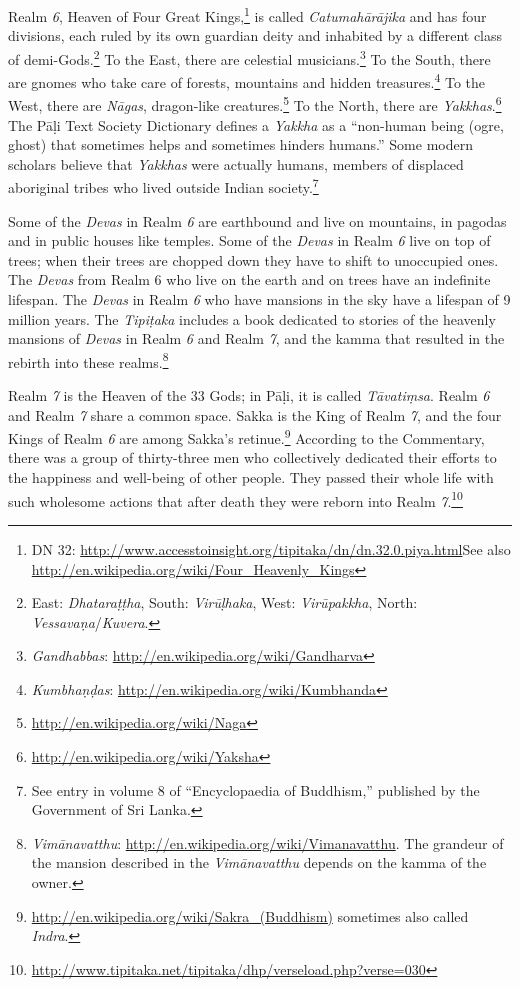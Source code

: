 \pagebreak

Realm \textit{6}, Heaven of Four Great Kings,\footnote{DN 32: \url{http://www.accesstoinsight.org/tipitaka/dn/dn.32.0.piya.html}\newline See also \url{http://en.wikipedia.org/wiki/Four_Heavenly_Kings}} is called \textit{Catumahārājika} and has four divisions, each ruled by its own guardian deity and inhabited by a different class of demi-Gods.\footnote{East: \textit{Dhataraṭṭha}, South: \textit{Virūḷhaka}, West: \textit{Virūpakkha}, North: \textit{Vessavaṇa}/\textit{Kuvera}.} To the East, there are celestial musicians.\footnote{\textit{Gandhabbas}: \url{http://en.wikipedia.org/wiki/Gandharva}} To the South, there are gnomes who take care of forests, mountains and hidden treasures.\footnote{\textit{Kumbhaṇḍas}: \url{http://en.wikipedia.org/wiki/Kumbhanda}} To the West, there are \textit{Nāgas}, dragon-like creatures.\footnote{\url{http://en.wikipedia.org/wiki/Naga}} To the North, there are \textit{Yakkhas}.\footnote{\url{http://en.wikipedia.org/wiki/Yaksha}} The Pāḷi Text Society Dictionary defines a \textit{Yakkha} as a “non-human being (ogre, ghost) that sometimes helps and sometimes hinders humans.” Some modern scholars believe that \textit{Yakkhas} were actually humans, members of displaced aboriginal tribes who lived outside Indian society.\footnote{See entry in volume 8 of “Encyclopaedia of Buddhism,” published by the Government of Sri Lanka.}

Some of the \textit{Devas} in Realm \textit{6} are earthbound and live on mountains, in pagodas and in public houses like temples. Some of the \textit{Devas} in Realm \textit{6} live on top of trees; when their trees are chopped down they have to shift to unoccupied ones. The \textit{Devas} from Realm 6 who live on the earth and on trees have an indefinite lifespan. The \textit{Devas} in Realm \textit{6} who have mansions in the sky have a lifespan of 9 million years. The \textit{Tipiṭaka} includes a book dedicated to stories of the heavenly mansions of \textit{Devas} in Realm \textit{6} and Realm \textit{7}, and the kamma that resulted in the rebirth into these realms.\footnote{\textit{Vimānavatthu}: \url{http://en.wikipedia.org/wiki/Vimanavatthu}. The grandeur of the mansion described in the \textit{Vimānavatthu} depends on the kamma of the owner.}

Realm \textit{7} is the Heaven of the 33 Gods; in Pāḷi, it is called \textit{Tāvatiṃsa}. Realm \textit{6} and Realm \textit{7} share a common space. Sakka is the King of Realm \textit{7}, and the four Kings of Realm \textit{6} are among Sakka’s retinue.\footnote{\url{http://en.wikipedia.org/wiki/Sakra_(Buddhism)} sometimes also called \textit{Indra}.} According to the Commentary, there was a group of thirty-three men who collectively dedicated their efforts to the happiness and well-being of other people. They passed their whole life with such wholesome actions that after death they were reborn into Realm \textit{7}.\footnote{\url{http://www.tipitaka.net/tipitaka/dhp/verseload.php?verse=030}}

